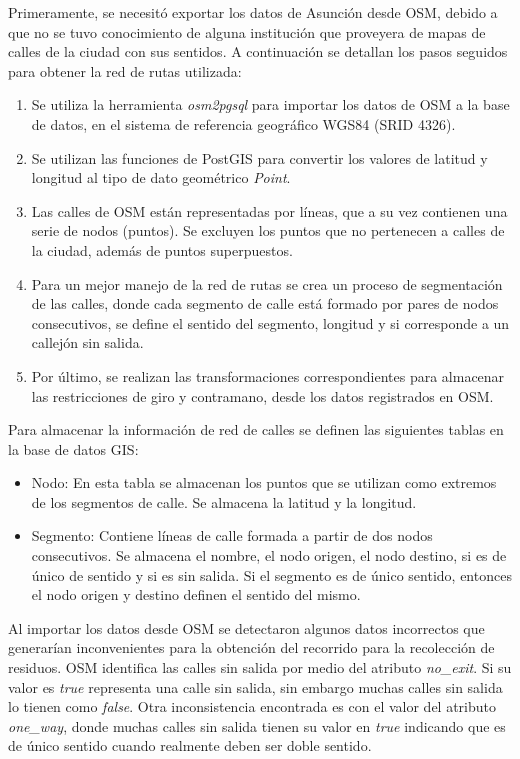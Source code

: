 Primeramente, se necesitó exportar los datos de Asunción desde OSM, debido a que no se tuvo conocimiento de alguna institución que proveyera de mapas de calles de la ciudad con sus sentidos. A continuación se detallan los pasos seguidos para obtener la red de rutas utilizada: 
\begin{enumerate}
    \item Se utiliza la herramienta \textit{osm2pgsql} para importar los datos de OSM a la base de datos, en el sistema de referencia geográfico WGS84 (SRID 4326). 
    \item Se utilizan las funciones de PostGIS para convertir los valores de latitud y longitud al tipo de dato geométrico \textit{Point}. 
    \item Las calles de OSM están representadas por líneas, que a su vez contienen una serie de nodos (puntos). Se excluyen los puntos que no pertenecen a calles de la ciudad, además de puntos superpuestos.
    \item Para un mejor manejo de la red de rutas se crea un proceso de segmentación de las calles, donde cada segmento de calle está formado por pares de nodos consecutivos, se define el sentido del segmento, longitud y si corresponde a un callejón sin salida.
    \item Por último, se realizan las transformaciones correspondientes para almacenar las restricciones de giro y contramano, desde los datos registrados en OSM.
\end{enumerate}

Para almacenar la información de red de calles se definen las siguientes tablas en la base de datos GIS:

\begin{itemize}
    \item Nodo: En esta tabla se almacenan los puntos que se utilizan como extremos de los segmentos de calle. Se almacena la latitud y la longitud.
    \item Segmento: Contiene líneas de calle formada a partir de dos nodos consecutivos. Se almacena el nombre, el nodo origen, el nodo destino, si es de único de sentido y si es sin salida. Si el segmento es de único sentido, entonces el nodo origen y destino definen el sentido del mismo.
\end{itemize}

Al importar los datos desde OSM se detectaron algunos datos incorrectos que generarían inconvenientes para la obtención del recorrido para la recolección de residuos. OSM identifica las calles sin salida por medio del atributo \textit{no\_exit}. Si su valor es \textit{true} representa una calle sin salida, sin embargo muchas calles sin salida lo tienen como \textit{false}. Otra inconsistencia encontrada es con el valor del atributo \textit{one\_way}, donde muchas calles sin salida tienen su valor en \textit{true} indicando que es de único sentido cuando realmente deben ser doble sentido.


